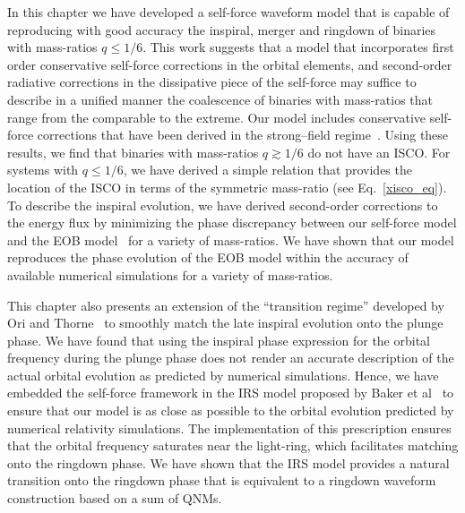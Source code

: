 In this chapter we have developed a self-force waveform model that is capable of reproducing with good accuracy the inspiral, merger and ringdown of binaries with mass-ratios \(q\leq 1/6\). This work suggests that a model that incorporates first order conservative self-force corrections in the orbital elements, and second-order radiative corrections in the dissipative piece of the self-force may suffice to describe in a unified manner the coalescence of binaries with mass-ratios that range from the comparable to the extreme. Our model includes conservative self-force corrections that have been derived in the strong--field regime~\cite{Akcay:2012}. Using these results, we find that binaries with mass-ratios \(q\gtrsim1/6\) do not have an ISCO. For systems with \(q\leq1/6\), we have derived a simple relation that provides the location of the ISCO in terms of the symmetric mass-ratio (see Eq.~\eqref{xisco_eq}). To describe the inspiral evolution, we have derived second-order corrections to the energy flux by 
minimizing the phase discrepancy between our self-force model and the EOB model~\cite{BuonannoEOBv2Main, Damour:2013} for a variety of mass-ratios. We have shown that our model reproduces the phase evolution of the EOB model within the accuracy of available numerical simulations for a variety of mass-ratios. 

This chapter also presents an extension of the ``transition regime'' developed by Ori and Thorne~\cite{amos} to smoothly match the late inspiral evolution onto the plunge phase. We have found that using the inspiral phase expression for the orbital frequency during the plunge phase does not render an accurate description of the actual orbital evolution as predicted by numerical simulations. Hence, we have embedded the self-force framework in the IRS model proposed by Baker et al~\cite{Baker:2008} to ensure that our model is as close as possible to the orbital evolution predicted by numerical relativity simulations. The implementation of this  prescription ensures that the orbital frequency saturates near the light-ring, which facilitates matching onto the ringdown phase. We have shown that the IRS model provides a natural transition onto the ringdown phase that is equivalent to a ringdown waveform construction based on a sum of QNMs. 


